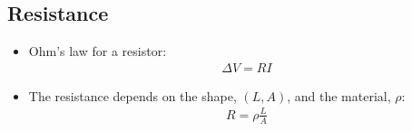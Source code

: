 \documentclass[aspectratio=169,
hyperref={colorlinks,urlcolor=blue}
]{beamer}
\begin{document}
\subsection{Resistance}
\label{subsec:resistance}
{
\begin{itemize}
\item Ohm's law for a resistor:
\begin{align*}
\Delta V = R I
\end{align*}
\item The resistance depends on the shape, $(L,A)$, and the material, $\rho$:
\begin{align*}
R=\rho\frac{L}{A}
\end{align*}
\end{itemize}

}
\end{document}
